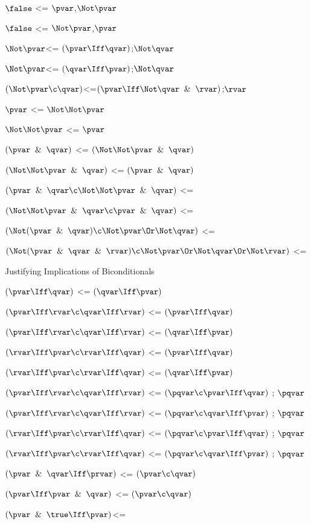 $\false$ <= $\pvar $,$\Not\pvar$

$\false$ <= $\Not\pvar $,$\pvar$

$\Not\pvar $<= $(\pvar \Iff \qvar)$;$\Not\qvar$

$\Not\pvar $<= $(\qvar \Iff \pvar)$;$\Not\qvar$

$(\Not\pvar \c\qvar )$<=$(\pvar \Iff \Not\qvar \And \rvar)$;$\rvar$

$\pvar$ <= $\Not \Not \pvar$

$\Not \Not \pvar$ <= $\pvar$

$(\pvar \And \qvar)$ <= $(\Not \Not \pvar \And \qvar)$

$(\Not \Not \pvar \And \qvar)$ <= $(\pvar \And \qvar)$

$(\pvar \And \qvar \c \Not \Not \pvar \And \qvar)$ <= 

$(\Not \Not \pvar \And \qvar \c \pvar \And \qvar)$ <= 

$(\Not (\pvar \And \qvar) \c \Not \pvar \Or \Not \qvar)$ <=

$(\Not (\pvar \And \qvar \And \rvar) \c \Not \pvar \Or \Not \qvar \Or \Not \rvar)$ <=

\lineb

Justifying Implications of Biconditionals
\lineb

$(\pvar \Iff \qvar)$ <= $(\qvar \Iff \pvar)$

$(\pvar \Iff \rvar \c \qvar \Iff \rvar)$ <= $(\pvar \Iff \qvar)$

$(\pvar \Iff \rvar \c \qvar \Iff \rvar)$ <= $(\qvar \Iff \pvar)$

$(\rvar \Iff \pvar \c\rvar \Iff \qvar)$ <= $(\pvar \Iff \qvar)$

$(\rvar \Iff \pvar \c\rvar \Iff  \qvar )$ <= $(\qvar \Iff \pvar)$

$(\pvar \Iff \rvar \c \qvar \Iff \rvar)$ <= $(\pqvar \c\pvar \Iff \qvar)$ ; $\pqvar$

$(\pvar \Iff \rvar \c \qvar \Iff \rvar)$ <= $(\pqvar \c\qvar \Iff \pvar)$ ; $\pqvar$

$(\rvar \Iff \pvar \c\rvar \Iff \qvar)$ <= $(\pqvar \c\pvar \Iff \qvar)$ ; $\pqvar$

$(\rvar \Iff \pvar \c\rvar \Iff  \qvar )$ <= $(\pqvar \c\qvar \Iff \pvar)$ ; $\pqvar$

$(\pvar \And \qvar \Iff \prvar)$ <= $(\pvar \c \qvar)$

$(\pvar \Iff \pvar\And \qvar)$ <= $(\pvar \c \qvar)$

$(\pvar \And \true \Iff \pvar)$<=

